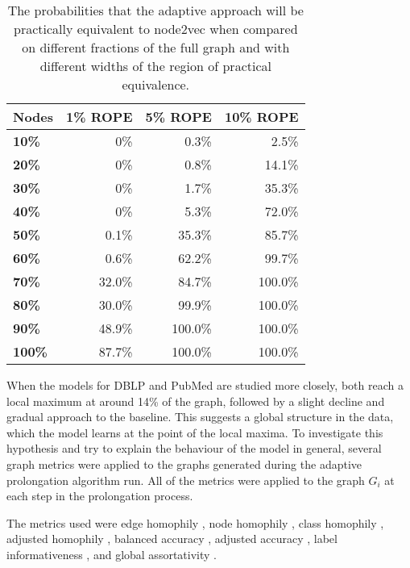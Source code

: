 \begin{table}
  \caption{The probabilities that the adaptive approach will be practically equivalent to node2vec when compared on different fractions of the full graph and with different widths of the region of practical equivalence.}
  \label{tab:bayesian-adaptive}
  \centering
  \begin{tabular}{lrrr}
    \toprule
    \textbf{Nodes} & \textbf{1\% ROPE} & \textbf{5\% ROPE} & \textbf{10\% ROPE} \\
    \midrule
    \textbf{10\%}  & 0\%               & 0.3\%             & 2.5\%              \\
    \textbf{20\%}  & 0\%               & 0.8\%             & 14.1\%             \\
    \textbf{30\%}  & 0\%               & 1.7\%             & 35.3\%             \\
    \textbf{40\%}  & 0\%               & 5.3\%             & 72.0\%             \\
    \textbf{50\%}  & 0.1\%             & 35.3\%            & 85.7\%             \\
    \textbf{60\%}  & 0.6\%             & 62.2\%            & 99.7\%             \\
    \textbf{70\%}  & 32.0\%            & 84.7\%            & 100.0\%            \\
    \textbf{80\%}  & 30.0\%            & 99.9\%            & 100.0\%            \\
    \textbf{90\%}  & 48.9\%            & 100.0\%           & 100.0\%            \\
    \textbf{100\%} & 87.7\%            & 100.0\%           & 100.0\%            \\
    \bottomrule
  \end{tabular}
\end{table}

When the models for DBLP and PubMed are studied more closely, both reach a local maximum at around 14\% of the graph, followed by a slight decline and gradual approach to the baseline. This suggests a global structure in the data, which the model learns at the point of the local maxima. To investigate this hypothesis and try to explain the behaviour of the model in general, several graph metrics were applied to the graphs generated during the adaptive prolongation algorithm run. All of the metrics were applied to the graph \( G_i \) at each step in the prolongation process.

The metrics used were edge homophily \cite{zhu_beyond_2020}, node homophily \cite{pei_geom-gcn_2020}, class homophily \cite{lim_large_2021}, adjusted homophily \cite{platonov_characterizing_2022}, balanced accuracy \cite{platonov_characterizing_2022}, adjusted accuracy \cite{platonov_characterizing_2022}, label informativeness \cite{platonov_characterizing_2022}, and global assortativity \cite{newman_mixing_2003}.

